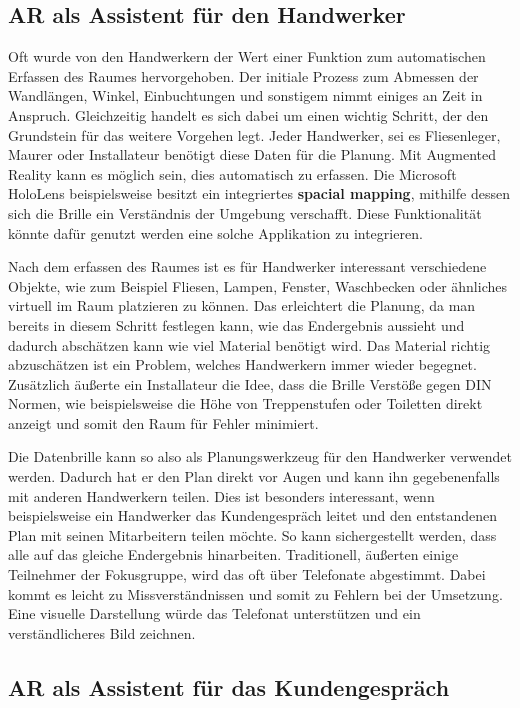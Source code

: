 \subsection{AR als Assistent für den Handwerker}

Oft wurde von den Handwerkern der Wert einer Funktion zum automatischen Erfassen des Raumes hervorgehoben. Der initiale Prozess zum Abmessen der Wandlängen, Winkel, Einbuchtungen und sonstigem nimmt einiges an Zeit in Anspruch. Gleichzeitig handelt es sich dabei um einen wichtig Schritt, der den Grundstein für das weitere Vorgehen legt. Jeder Handwerker, sei es Fliesenleger, Maurer oder Installateur benötigt diese Daten für die Planung. Mit Augmented Reality kann es möglich sein, dies automatisch zu erfassen. Die Microsoft HoloLens beispielsweise besitzt ein integriertes \textbf{spacial mapping}, mithilfe dessen sich die Brille ein Verständnis der Umgebung verschafft. Diese Funktionalität könnte dafür genutzt werden eine solche Applikation zu integrieren. 

Nach dem erfassen des Raumes ist es für Handwerker interessant verschiedene Objekte, wie zum Beispiel Fliesen, Lampen, Fenster, Waschbecken oder ähnliches virtuell im Raum platzieren zu können. Das erleichtert die Planung, da man bereits in diesem Schritt festlegen kann, wie das Endergebnis aussieht und dadurch abschätzen kann wie viel Material benötigt wird. Das Material richtig abzuschätzen ist ein Problem, welches Handwerkern immer wieder begegnet. Zusätzlich äußerte ein Installateur die Idee, dass die Brille Verstöße gegen DIN Normen, wie beispielsweise die Höhe von Treppenstufen oder Toiletten direkt anzeigt und somit den Raum für Fehler minimiert. 

Die Datenbrille kann so also als Planungswerkzeug für den Handwerker verwendet werden. Dadurch hat er den Plan direkt vor Augen und kann ihn gegebenenfalls mit anderen Handwerkern teilen. Dies ist besonders interessant, wenn beispielsweise ein Handwerker das Kundengespräch leitet und den entstandenen Plan mit seinen Mitarbeitern teilen möchte. So kann sichergestellt werden, dass alle auf das gleiche Endergebnis hinarbeiten. Traditionell, äußerten einige Teilnehmer der Fokusgruppe, wird das oft über Telefonate abgestimmt. Dabei kommt es leicht zu Missverständnissen und somit zu Fehlern bei der Umsetzung. Eine visuelle Darstellung würde das Telefonat unterstützen und ein verständlicheres Bild zeichnen.

\subsection{AR als Assistent für das Kundengespräch}


